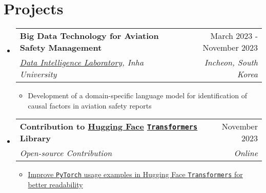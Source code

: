 \documentclass[letterpaper,11pt]{article}
\makeatletter
\newcommand{\resumeSubheading}[4]{
  \vspace{-1pt}\item
    \begin{tabular*}{0.97\textwidth}{l@{\extracolsep{\fill}}r}
      #1 & #2 \\
      \textit{\small#3} & \textit{\small #4} \\
    \end{tabular*}\vspace{-5pt}
}
\makeatother
\begin{document}
    
    \section{Projects}
    \begin{itemize}[leftmargin=*,label=]       
        \resumeSubheading
        {\textbf{Big Data Technology for Aviation Safety Management}}{March 2023 - November 2023}
            {\href{http://dilab.inha.ac.kr/}{Data Intelligence Laboratory}, Inha University}{Incheon, South Korea}
            \begin{itemize}[label=\bullet]
                \item{Development of a domain-specific language model for identification of causal factors in aviation safety reports}
            \end{itemize}

        \resumeSubheading
        {\textbf{Contribution to \href{https://huggingface.co/}{Hugging Face} \texttt{\href{https://github.com/huggingface/transformers}{Transformers}} Library}}{November 2023}
            {Open-source Contribution}{Online}
            \begin{itemize}[label=\bullet]
                \item{\href{https://github.com/huggingface/transformers/pull/27184}{Improve \texttt{PyTorch} usage examples in Hugging Face \texttt{Transformers} for better readability}}
            \end{itemize}


\end{itemize}
\end{document}
